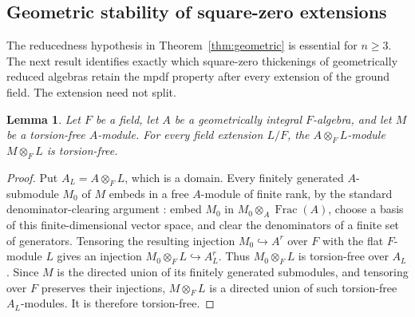 \documentclass[11pt,a4paper]{amsart}
\newtheorem{lemma}[theorem]{Lemma}
\theoremstyle{definition}
\theoremstyle{remark}
\numberwithin{equation}{section}
\begin{document}
\subsection{Geometric stability of square-zero extensions}

The reducedness hypothesis in Theorem~\ref{thm:geometric} is essential for
$n\ge3$. The next result identifies exactly which square-zero thickenings
of geometrically reduced algebras retain the mpdf property after every
extension of the ground field. The extension need not split.

\begin{lemma}\label{lem:geometric-torsionfree}
Let $F$ be a field, let $A$ be a geometrically integral $F$-algebra,
and let $M$ be a torsion-free $A$-module. For every field extension
$L/F$, the $A\otimes_F L$-module $M\otimes_F L$ is torsion-free.
\end{lemma}
\begin{proof}
Put $A_L=A\otimes_F L$, which is a domain. Every finitely generated
$A$-submodule $M_0$ of $M$ embeds in a free $A$-module of finite
rank, by the standard denominator-clearing argument
\cite[Tag 0AUU]{Stacks}: embed
$M_0$ in $M_0\otimes_A\operatorname{Frac}(A)$, choose a basis of this
finite-dimensional vector space, and clear the denominators of a finite
set of generators. Tensoring the resulting injection $M_0\hookrightarrow
A^r$ over $F$ with the flat $F$-module $L$ gives an injection
$M_0\otimes_F L\hookrightarrow A_L^r$. Thus $M_0\otimes_F L$ is
torsion-free over $A_L$. Since $M$ is the directed union of its finitely
generated submodules, and tensoring over $F$ preserves their injections,
$M\otimes_F L$ is a directed union of such torsion-free $A_L$-modules.
It is therefore torsion-free.
\end{proof}
\end{document}
